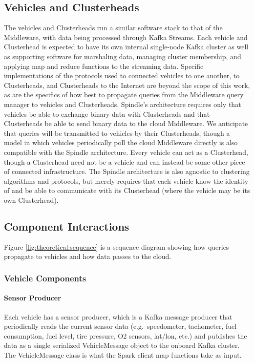 \documentclass{thesis}
\begin{document}
\subsection{Vehicles and Clusterheads}
    The vehicles and Clusterheads run a similar software stack to that of the Middleware, with data being
    processed through Kafka Streams. Each vehicle and Clusterhead is expected to have its own internal
    single-node Kafka cluster as well as supporting software for marshaling data, managing cluster membership,
    and applying map and reduce functions to the streaming data.
    Specific implementations of the protocols used to connected vehicles to one another, to Clusterheads, and Clusterheads
    to the Internet are beyond the scope of this work, as are the specifics of how best to propagate queries from the Middleware
    query manager to vehicles and Clusterheads. Spindle's architecture requires only that vehicles be able to exchange binary
    data with Clusterheads and that Clusterheads be able to send binary data to the cloud Middleware. We anticipate that queries
    will be transmitted to vehicles by their Clusterheads, though a model in which vehicles periodically poll the cloud Middleware
    directly is also compatible with the Spindle architecture.
    Every vehicle can act as a Clusterhead, though a Clusterhead need not be a vehicle and can instead be some other piece of
    connected infrastructure. The Spindle architecture is also agnostic to clustering algorithms and protocols, but merely requires
    that each vehicle know the identity of and be able to communicate with its Clusterhead (where the vehicle may be its own Clusterhead).

\subsection{Component Interactions}
    Figure \ref{fig:theoretical:sequence} is a sequence diagram showing how queries propagate to vehicles and how data passes to the cloud. %
\subsubsection{Vehicle Components}
    \paragraph{Sensor Producer} 
        Each vehicle has a sensor producer, which is a Kafka message producer that periodically reads the current sensor data (e.g.\
        speedometer, tachometer, fuel consumption, fuel level, tire pressure, O2 sensors, lat/lon, etc.) and publishes the data
        as a single serialized VehicleMessage object to the onboard Kafka cluster. The VehicleMessage class is what the Spark client
        map functions take as input.
\end{document}
